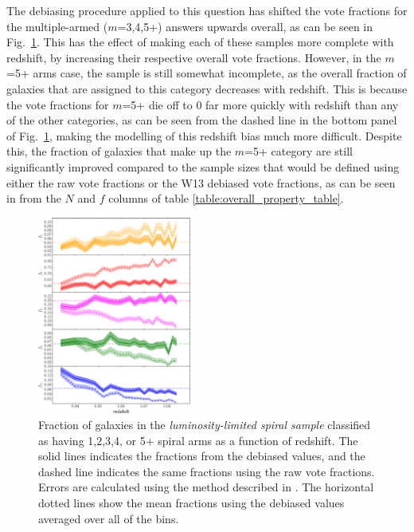 \documentclass[useAMS,usenatbib]{mn2e}
\begin{document}
The debiasing procedure applied to this question has shifted the vote fractions for the multiple-armed ($m$=3,4,5+) answers upwards overall, as can be seen in Fig.~\ref{fig:arm_number_trend}. This has the effect of making each of these samples more complete with redshift, by increasing their respective overall vote fractions. However, in the $m$=5+ arms case, the sample is still somewhat incomplete, as the overall fraction of galaxies that are assigned to this category decreases with redshift. This is because the vote fractions for $m$=5+ die off to 0 far more quickly with redshift than any of the other categories, as can be seen from the dashed line in the bottom panel of Fig.~\ref{fig:arm_number_trend}, making the  modelling of this redshift bias much more difficult. Despite this, the fraction of galaxies that make up the $m$=5+ category are still significantly improved compared to the sample sizes that would be defined using either the raw vote fractions or the W13 debiased vote fractions, as can be seen in from the $N$ and $f$ columns of table \ref{table:overall_property_table}. 

\begin{figure}
		\centering

        \includegraphics[width=0.45\textwidth]{Images/Results/sample_fractions.pdf}

        \caption{Fraction of galaxies in the \textit{luminosity-limited spiral sample} classified as having 1,2,3,4, or 5+ spiral arms as a function of redshift. The solid lines indicates the fractions from the debiased values, and the dashed line indicates the same fractions using the raw vote fractions. Errors are calculated using the method described in \citet{Cameron_11}. The horizontal dotted lines show the mean fractions using the debiased values averaged over all of the bins.}

        \label{fig:arm_number_trend}

\end{figure}
\end{document}
